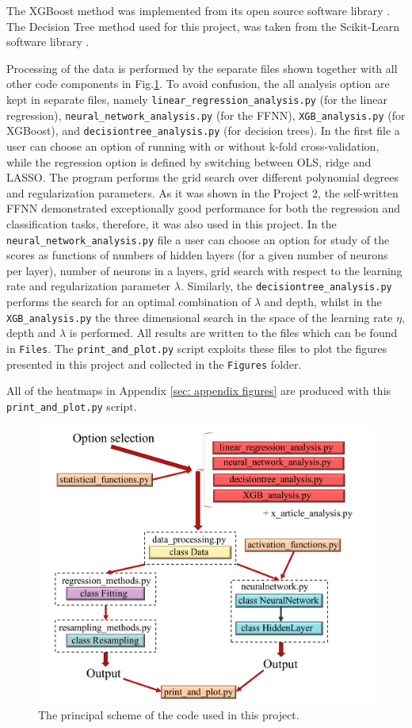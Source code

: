 \documentclass[numberedappendix, twocolappendix]{emulateapj}
\begin{document}
The XGBoost method was implemented from its open source software library \cite{xgboost software}.
The Decision Tree method used for this project, was taken from the Scikit-Learn software library \cite{skl}.

Processing of the data is performed by the separate files shown together with all other code components in Fig.\ref{fig: code}. To avoid confusion, the all analysis option are kept in separate files, namely \texttt{linear\_regression\_analysis.py} (for the linear regression), \texttt{neural\_network\_analysis.py} (for the FFNN), \texttt{XGB\_analysis.py} (for XGBoost), and \texttt{decisiontree\_analysis.py} (for decision trees). In the first file a user can choose an option of running with or without k-fold cross-validation, while the regression option is defined by switching between  OLS, ridge and LASSO. The program performs the grid search over different polynomial degrees and regularization parameters. As it was shown in the Project 2, the self-written FFNN demonstrated exceptionally good performance for both the regression and classification tasks, therefore, it was also used in this project. In the \texttt{neural\_network\_analysis.py} file a user can choose an option for study of the scores as functions of numbers of hidden layers (for a given number of neurons per layer), number of neurons in a layers, grid search with respect to the learning rate and regularization parameter $\lambda$. Similarly, the \texttt{decisiontree\_analysis.py} performs the search for an optimal combination of $\lambda$ and depth, whilst in the  \texttt{XGB\_analysis.py} the three dimensional search in the space of the learning rate $\eta$, depth and $\lambda$ is performed. All results are written to the files which can be found in \texttt{Files}.
The \texttt{print\_and\_plot.py} script exploits these files to plot the figures presented in this project and collected in the \texttt{Figures} folder.

All of the heatmaps in Appendix \ref{sec: appendix figures} are produced with this \texttt{print\_and\_plot.py} script.

\begin{figure}[!htb]
    \centering
    \includegraphics[width=.49\textwidth]{Figures/code.pdf}
    \caption{The principal scheme of the code used in this project.}
    \label{fig: code}
\end{figure}
\end{document}
